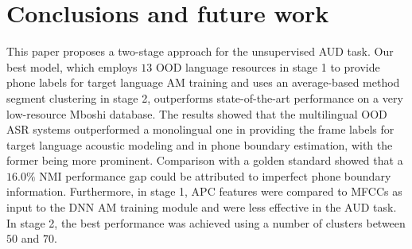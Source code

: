 \documentclass[a4paper]{article}
\begin{document}


\section{Conclusions and future work}
\label{sec:conclu}
This paper proposes a two-stage approach for the unsupervised AUD task. Our best model, which employs $13$ OOD language resources in stage 1 to provide phone labels for target language AM training and uses an average-based method segment clustering in stage 2, outperforms state-of-the-art performance on a very low-resource Mboshi database. The results showed that the multilingual OOD ASR systems outperformed a monolingual one in providing the frame labels for target language acoustic modeling and in phone boundary estimation, with the former being more prominent. Comparison with a golden standard showed that a $16.0\%$ NMI performance gap could be attributed to imperfect phone boundary information. Furthermore, in stage 1, APC features were compared to MFCCs as input to the DNN AM training module and were less effective in the AUD task. In stage 2, the best performance was achieved using a number of clusters between $50$ and $70$.





\end{document}
